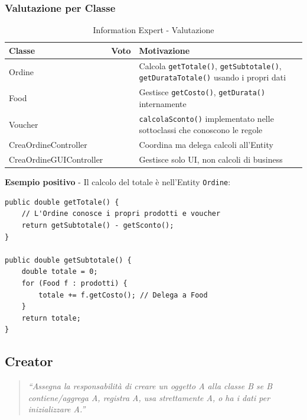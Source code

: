 \documentclass[12pt,a4paper]{article}
\newcommand{\ok}{\textcolor{okgreen}{\checkmark}}
\begin{document}
\subsubsection{Valutazione per Classe}

\begin{table}[h]
\centering
\begin{tabular}{|l|c|p{8cm}|}
\hline
\textbf{Classe} & \textbf{Voto} & \textbf{Motivazione} \\
\hline
Ordine & \ok & Calcola \texttt{getTotale()}, \texttt{getSubtotale()}, \texttt{getDurataTotale()} usando i propri dati \\
\hline
Food & \ok & Gestisce \texttt{getCosto()}, \texttt{getDurata()} internamente \\
\hline
Voucher & \ok & \texttt{calcolaSconto()} implementato nelle sottoclassi che conoscono le regole \\
\hline
CreaOrdineController & \ok & Coordina ma delega calcoli all'Entity \\
\hline
CreaOrdineGUIController & \ok & Gestisce solo UI, non calcoli di business \\
\hline
\end{tabular}
\caption{Information Expert - Valutazione}
\end{table}

\textbf{Esempio positivo} - Il calcolo del totale è nell'Entity \texttt{Ordine}:

\begin{lstlisting}[style=javastyle, caption={Information Expert in Ordine}]
public double getTotale() {
    // L'Ordine conosce i propri prodotti e voucher
    return getSubtotale() - getSconto();
}

public double getSubtotale() {
    double totale = 0;
    for (Food f : prodotti) {
        totale += f.getCosto(); // Delega a Food
    }
    return totale;
}
\end{lstlisting}

\subsection{Creator}

\begin{quote}
\textit{``Assegna la responsabilità di creare un oggetto A alla classe B se B contiene/aggrega A, registra A, usa strettamente A, o ha i dati per inizializzare A.''}
\end{quote}
\end{document}
